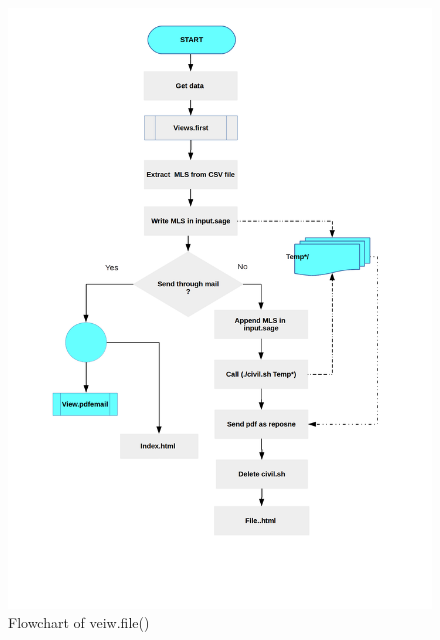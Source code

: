 \begin{figure}[H]
\centering \includegraphics[scale=0.27]{images/flowchartfile.png}
\caption{Flowchart of veiw.file()}
\label{fig:FD3}
\end{figure}
